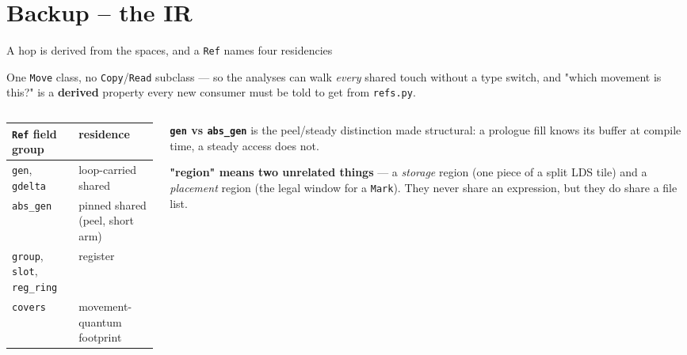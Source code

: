 \documentclass[aspectratio=169,9pt]{beamer}
\newcommand{\key}[1]{\textcolor{acc}{\textbf{#1}}}
\newcommand{\bad}[1]{\textcolor{warn}{\textbf{#1}}}
\begin{document}
\section{Backup -- the IR}
\begin{frame}{A hop is derived from the spaces, and a \texttt{Ref} names four residencies}
\centering
{}

\vspace{2pt}
{\scriptsize One \texttt{Move} class, no \texttt{Copy}/\texttt{Read} subclass --- so the analyses can walk
\emph{every} shared touch without a type switch, and "which movement is this?" is a
\bad{derived} property every new consumer must be told to get from \texttt{refs.py}.}

\vspace{5pt}
\begin{columns}[T]
\begin{column}{0.52\textwidth}
\scriptsize
\begin{tabular}{@{}ll@{}}
\toprule
\texttt{Ref} field group & residence \\
\midrule
\texttt{gen}, \texttt{gdelta}         & loop-carried shared \\
\texttt{abs\_gen}                     & pinned shared (peel, short arm) \\
\texttt{group}, \texttt{slot}, \texttt{reg\_ring} & register \\
\texttt{covers}                       & movement-quantum footprint \\
\bottomrule
\end{tabular}
\end{column}
\begin{column}{0.46\textwidth}
\scriptsize
\key{\texttt{gen} vs \texttt{abs\_gen}} is the peel/steady distinction made structural: a
prologue fill knows its buffer at compile time, a steady access does not.

\vspace{3pt}
\bad{"region" means two unrelated things} --- a \emph{storage} region (one piece of a split
LDS tile) and a \emph{placement} region (the legal window for a \texttt{Mark}).
They never share an expression, but they do share a file list.
\end{column}
\end{columns}
\end{frame}
\end{document}
